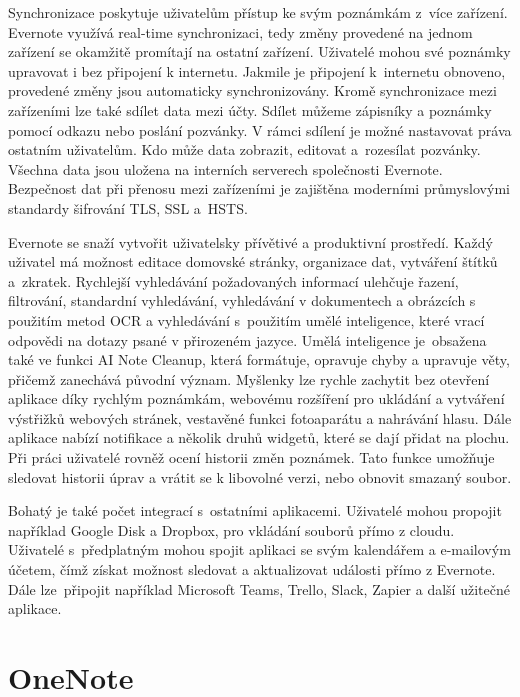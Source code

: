 \documentclass[czech, bc, kiv, he, iso690numb]{fasthesis}
\begin{document}
\newpage

Synchronizace poskytuje uživatelům přístup ke svým poznámkám z~více zařízení. Evernote využívá real-time synchronizaci, tedy změny provedené na jednom zařízení se okamžitě promítají na ostatní zařízení. Uživatelé mohou své poznámky upravovat i bez připojení k internetu. Jakmile je připojení k~internetu obnoveno, provedené změny jsou automaticky synchronizovány. Kromě synchronizace mezi zařízeními lze také sdílet data mezi účty. Sdílet můžeme zápisníky a poznámky pomocí odkazu nebo poslání pozvánky. V rámci sdílení je možné nastavovat práva ostatním uživatelům. Kdo může data zobrazit, editovat a~rozesílat pozvánky. Všechna data jsou uložena na interních serverech společnosti Evernote. Bezpečnost dat při přenosu mezi zařízeními je zajištěna moderními průmyslovými standardy šifrování \gls{TLS}, \gls{SSL} a~\gls{HSTS}.

Evernote se snaží vytvořit uživatelsky přívětivé a produktivní prostředí. Každý uživatel má možnost editace domovské stránky, organizace dat, vytváření štítků a~zkratek. Rychlejší vyhledávání požadovaných informací ulehčuje řazení, filtrování, standardní vyhledávání, vyhledávání v dokumentech a obrázcích s použitím metod \gls{OCR} a vyhledávání s~použitím umělé inteligence, které vrací odpovědi na dotazy psané v přirozeném jazyce. Umělá inteligence je~obsažena také ve funkci AI Note Cleanup, která formátuje, opravuje chyby a upravuje věty, přičemž zanechává původní význam. Myšlenky lze rychle zachytit bez otevření aplikace díky rychlým poznámkám, webovému rozšíření pro ukládání a vytváření výstřižků webových stránek, vestavěné funkci fotoaparátu a nahrávání hlasu. Dále aplikace nabízí notifikace a několik druhů widgetů, které se dají přidat na plochu. Při práci uživatelé rovněž ocení historii změn poznámek. Tato funkce umožňuje sledovat historii úprav a vrátit se k libovolné verzi, nebo obnovit smazaný soubor.

Bohatý je také počet integrací s~ostatními aplikacemi. Uživatelé mohou propojit například Google Disk a Dropbox, pro vkládání souborů přímo z cloudu. Uživatelé s~předplatným mohou spojit aplikaci se svým kalendářem a e-mailovým účetem, čímž získat možnost sledovat a aktualizovat události přímo z Evernote. Dále lze~připojit například Microsoft Teams, Trello, Slack, Zapier a další užitečné aplikace.


\section{OneNote}
\end{document}
